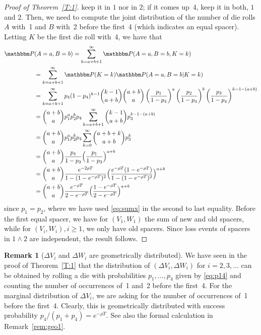 \documentclass[preprint,authoryear]{elsarticle}
\theoremstyle{definition}
\newtheorem{remark}[proposition]{Remark}
\numberwithin{equation}{section}
\numberwithin{figure}{section}
\begin{document}
\begin{proof}[Proof of Theorem~\ref{T:1}]
  keep it in $\mathfrak 1$ nor in $\mathfrak 2$; if it comes up~4,
  keep it in both, $\mathfrak 1$ and $\mathfrak 2$. Then, we need to
  compute the joint distribution of the number of die rolls $A$
  with~1 and $B$ with~2 before the first~4 (which indicates an equal
  spacer). Letting
  $K$ be the first die roll with~4, we have that
  \begin{align*}
    \mathbbm P&(A = a, B=b) = \sum_{k = a+b+1}^\infty \mathbbm P(A=a, B=b, K=k)\\
              &= \sum_{k = a+b+1}^\infty \mathbbm P(K=k)\mathbbm P(A=a, B=b | K=k) \\
              &=\sum_{k = a+b+1}^\infty p_4 (1-p_4)^{k-1} \binom{k-1}{a+b}\binom{a+b}{a} 
                \left(\frac{p_1}{1-p_4}\right)^{a}\left(\frac{p_2}{1-p_4}\right)^{b}\left(\frac{p_3}{1-p_4}\right)^{k-1-(a+b)}\\
              &=\binom{a+b}{a} p_1^{a} p_2^{b} p_4 \sum_{k=a+b+1}^\infty \binom{k-1}{a+b} p_3^{k-1-(a+b)}\\
              &=\binom{a+b}{a} p_1^{a} p_2^{b} p_4 \sum_{k=0}^\infty \binom{a+b+k}{a+b} p_3^{k}\\
              &=\binom{a+b}{a} \frac{p_4}{1-p_3} \Big(\frac{p_1}{1-p_3}\Big)^{a+b} \\
              & = \binom{a+b}{a} \frac{e^{-2\rho T}}{1-(1-e^{-\rho T})^2} 
                \Big(\frac{e^{-\rho T}(1-e^{-\rho T})}{1-(1-e^{-\rho T})^2}\Big)^{a+b}\\
              & = \binom{a+b}{a} \frac{e^{-\rho T}}{2 - e^{-\rho T}} 
                \Big(\frac{1-e^{-\rho T}}{2 - e^{-\rho T}}\Big)^{a+b}
  \end{align*}
  since $p_1=p_2$, where we have used \eqref{eq:sumx} in the second to
  last equality. Before the first equal spacer, we have for
  $(V_1, W_1)$ the sum of new and old spacers, while for
  $(V_i, W_i), i\geq 1$,
  we only have old spacers. Since loss events of spacers in
  $\mathfrak 1\wedge \mathfrak 2$ are independent,
  the result follows.
\end{proof}

\begin{remark}[$\Delta V_i$ and $\Delta W_i$ are geometrically
  distributed\label{rem:geo2}]
  We have seen in the proof of Theorem~\ref{T:1} that the distribution
  of $(\Delta V_i, \Delta W_i)$ for $i=2,3,\dots$ can be obtained by
  rolling a die with probabilities $p_1,\dots,p_4$ given by
  \eqref{eq:p14} and counting the number of occurrences of~1 and~2 before
  the first~4. For the marginal distribution of $\Delta V_i$, we are
  asking for the number of occurrences of~1 before the
  first~4. Clearly, this is geometrically distributed with success
  probability $p_4/(p_1+p_4) = e^{-\rho T}$. See also the
  formal calculation in Remark~\ref{rem:geo1}.
\end{remark}
\end{document}
